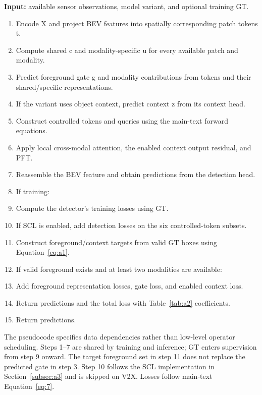 \begin{algorithm}[tbp]
\caption{Forward computation and training supervision}
\label{alg:a1}
\small
\textbf{Input:} available sensor observations, model variant, and optional training GT.
\begin{enumerate}[leftmargin=2.4em,label=\arabic*.,itemsep=2pt]
\item Encode X and project BEV features into spatially corresponding patch tokens t.
\item Compute shared c and modality-specific u for every available patch and modality.
\item Predict foreground gate g and modality contributions from tokens and their shared/specific representations.
\item If the variant uses object context, predict context z from its context head.
\item Construct controlled tokens and queries using the main-text forward equations.
\item Apply local cross-modal attention, the enabled context output residual, and PFT.
\item Reassemble the BEV feature and obtain predictions from the detection head.
\item If training:
\item Compute the detector's training losses using GT.
\item If SCL is enabled, add detection losses on the six controlled-token subsets.
\item Construct foreground/context targets from valid GT boxes using Equation~\eqref{eq:a1}.
\item If valid foreground exists and at least two modalities are available:
\item Add foreground representation losses, gate loss, and enabled context loss.
\item Return predictions and the total loss with Table~\ref{tab:a2} coefficients.
\item Return predictions.
\end{enumerate}
The pseudocode specifies data dependencies rather than low-level operator scheduling. Steps 1--7 are shared by training and inference; GT enters supervision from step 9 onward. The target foreground set in step 11 does not replace the predicted gate in step 3. Step 10 follows the SCL implementation in Section~\ref{subsec:a3} and is skipped on V2X. Losses follow main-text Equation~\eqref{eq:7}.
\end{algorithm}
